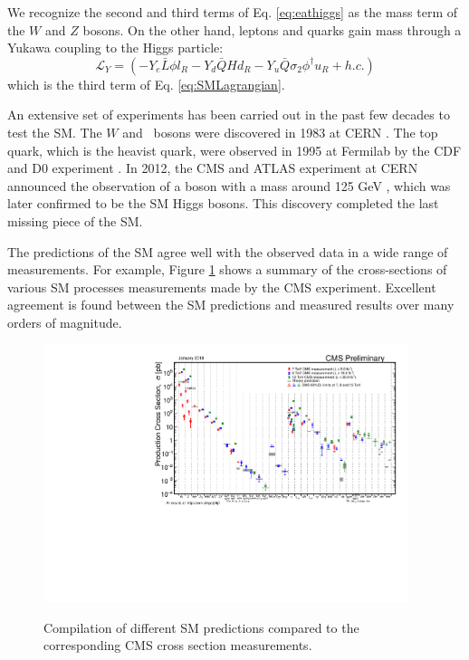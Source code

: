 \documentclass[thesis.tex]{subfiles}
\begin{document}
We recognize the second and third terms of Eq. \ref{eq:eathiggs} as the mass term of the $W$ and $Z$ bosons. On the other hand, leptons and quarks gain mass through a Yukawa coupling to the Higgs particle:
	\begin{equation}
		\mathcal{L}_Y = (- Y_e \bar{L} \phi l_R - Y_d \bar{Q}H d_R - Y_u \bar{Q} \sigma_2 \phi^\dagger u_R + h.c.)
	\end{equation}
which is the third term of Eq. \ref{eq:SMLagrangian}. 


An extensive set of experiments has been carried out in the past few decades to test the SM. 
The $W$ and \PZ~bosons were discovered in 1983 at CERN \cite{WdiscoveryUA1,WdiscoveryUA2,ZdiscoveryUA1,ZdiscoveryUA2}. 
The top quark, which is the heavist quark, were observed in 1995 at Fermilab by the CDF and D0 experiment \cite{TopdiscoveryCDF,TopdiscoveryD0}. 
In 2012, the CMS and ATLAS experiment at CERN announced the observation of a boson with a mass around 125 GeV \cite{HiggsCMS,HiggsATLAS}, which was later confirmed to be the SM Higgs bosons.
This discovery completed the last missing piece of the SM.  

The predictions of the SM agree well with the observed data in a wide range of measurements. 
For example, Figure \ref{fig1-1} shows a summary of the cross-sections of various SM processes measurements made by the CMS experiment.
Excellent agreement is found between the SM predictions and measured results over many orders of magnitude.

	\begin{figure}[h]
		\centering
	\includegraphics[width=0.95\textwidth]{plot/SigmaNew_v0.pdf}
	\label{fig1-1}
	\caption{Compilation of different SM predictions compared to the corresponding CMS cross section measurements.}
	\end{figure}
	
\end{document}
